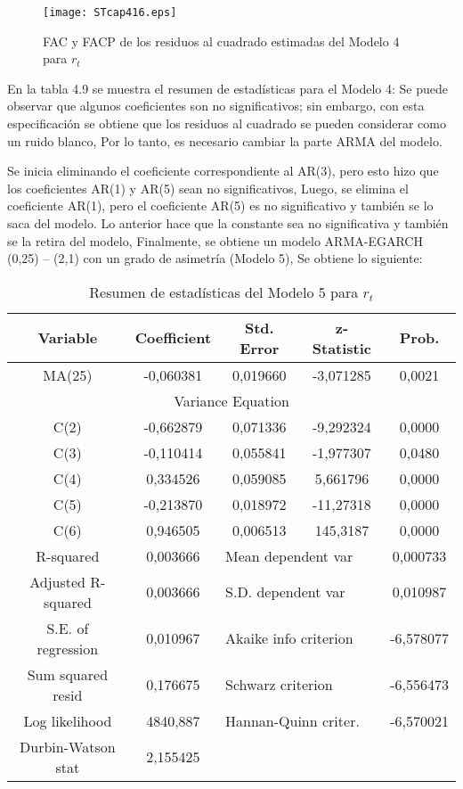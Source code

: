 \begin{figure}[H]
\centering
\texttt{[image: STcap416.eps]}
\caption{FAC y FACP de los residuos al cuadrado estimadas del Modelo 4 para $r_{t}$}
\end{figure}

En la tabla 4.9 se muestra el resumen de estad\'{i}sticas para el Modelo 4: Se puede observar que algunos coeficientes son no significativos; sin embargo, con esta especificaci\'{o}n se obtiene que los residuos al cuadrado se pueden considerar como un ruido blanco, Por lo tanto, es necesario cambiar la parte ARMA del modelo.\newline

Se inicia eliminando el coeficiente correspondiente al AR(3), pero esto hizo que los coeficientes AR(1) y AR(5) sean no significativos, Luego, se elimina el coeficiente AR(1), pero el coeficiente AR(5) es no significativo y tambi\'{e}n se lo saca del modelo. Lo anterior hace que la constante sea no significativa y tambi\'{e}n se la retira del modelo, Finalmente, se obtiene un modelo ARMA-EGARCH (0,25) -- (2,1) con un grado de asimetr\'{i}a (Modelo 5), Se obtiene lo siguiente:

\begin{table}[H]
\centering
\begin{tabular}{ccccc}\hline\hline
Variable & Coefficient & Std. Error & z-Statistic & Prob.\\ \hline\hline
MA(25) & -0,060381 & 0,019660 & -3,071285 & 0,0021 \\ \hline\hline
\multicolumn{5}{c}{Variance Equation} \\ \hline\hline
C(2) & -0,662879 & 0,071336 & -9,292324 & 0,0000 \\
C(3) & -0,110414 & 0,055841 & -1,977307 & 0,0480 \\
C(4) & 0,334526 & 0,059085 & 5,661796 & 0,0000 \\
C(5) & -0,213870 & 0,018972 & -11,27318 & 0,0000 \\
C(6) & 0,946505 & 0,006513 & 145,3187 & 0,0000 \\ \hline\hline
R-squared & 0,003666 & \multicolumn{2}{l}{Mean dependent var} & 0,000733 \\
Adjusted R-squared & 0,003666 & \multicolumn{2}{l}{S.D. dependent var} & 0,010987 \\
S.E. of regression & 0,010967 & \multicolumn{2}{l}{Akaike info criterion} & -6,578077 \\
Sum squared resid & 0,176675 & \multicolumn{2}{l}{Schwarz criterion} & -6,556473 \\
Log likelihood & 4840,887 & \multicolumn{2}{l}{Hannan-Quinn criter.} & -6,570021 \\
Durbin-Watson stat & 2,155425 & & & \\ \hline\hline 
\end{tabular}
\caption{Resumen de estad\'{i}sticas del Modelo 5 para $r_{t}$}
\end{table}

